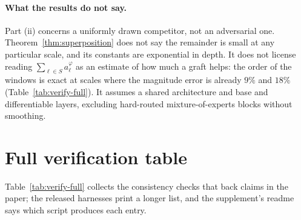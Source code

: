 \documentclass{article}
\theoremstyle{plain}
\theoremstyle{definition}
\theoremstyle{remark}
\begin{document}
\paragraph{What the results do not say.}
Part (ii) concerns a uniformly drawn competitor, not an adversarial one.
Theorem~\ref{thm:superposition} does not say the remainder is small at any
particular scale, and its constants are exponential in depth. It does not license
reading $\sum_{\ell\in S}a^{\varphi}_\ell$ as an estimate of how much a graft
helps: the order of the windows is exact at scales where the magnitude error is
already $9\%$ and $18\%$ (Table~\ref{tab:verify-full}). It assumes a shared architecture and base and differentiable layers,
excluding hard-routed mixture-of-experts blocks without smoothing.

\section{Full verification table}
\label{app:verify}

Table~\ref{tab:verify-full} collects the consistency checks that back claims in
the paper; the released harnesses print a longer list, and the supplement's
readme says which script produces each entry.
\end{document}
